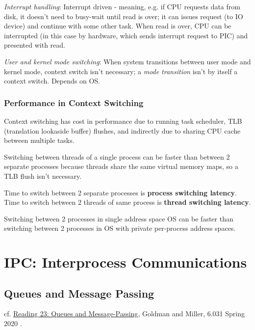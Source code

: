 \documentclass[10pt]{amsart}
\begin{document}
\begin{multicols*}{2}
\emph{Interrupt handling}: Interrupt driven - meaning, e.g. if CPU requests data from disk, it doesn't need to busy-wait until read is over; it can issues request (to IO device) and continue with some other task. When read is over, CPU can be interrupted (in this case by hardware, which sends interrupt request to PIC) and presented with read.

\emph{User and kernel mode switching}: When system transitions between user mode and kernel mode, context switch isn't necessary; a \emph{mode transition} isn't by itself a context switch. Depends on OS.

\subsubsection{Performance in Context Switching}

Context switching has cost in performance due to running task scheduler, TLB (translation lookaside buffer) flushes, and indirectly due to sharing CPU cache between multiple tasks.

Switching between threads of a single process can be faster than between 2 separate processes because threads share the same virtual memory maps, so a TLB flush isn't necessary.

Time to switch between 2 separate processes is \textbf{process switching latency}. Time to switch between 2 threads of same process is \textbf{thread switching latency}. 

Switching between 2 processes in single address space OS can be faster than switching between 2 processes in OS with private per-process address spaces.




\section{IPC: Interprocess Communications}

\subsection{Queues and Message Passing}

cf. \href{http://web.mit.edu/6.031/www/sp20/classes/23-queues/}{Reading 23: Queues and Message-Passing}, Goldman and Miller, 6.031 Spring 2020 \cite{6dot005and6dot031}. 


\end{multicols*}
\end{document}
